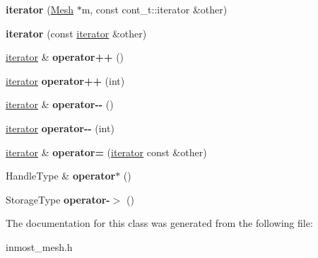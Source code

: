 \begin{DoxyCompactItemize}
\item 
\hypertarget{classINMOST_1_1ElementArray_1_1iterator_a0d7c6fedcf18f246d2525278480ab202}{{\bfseries iterator} (\hyperlink{classINMOST_1_1Mesh}{Mesh} $\ast$m, const cont\-\_\-t\-::iterator \&other)}\label{classINMOST_1_1ElementArray_1_1iterator_a0d7c6fedcf18f246d2525278480ab202}

\item 
\hypertarget{classINMOST_1_1ElementArray_1_1iterator_af045c453415f0bdb6f66ecc275d68ad9}{{\bfseries iterator} (const \hyperlink{classINMOST_1_1ElementArray_1_1iterator}{iterator} \&other)}\label{classINMOST_1_1ElementArray_1_1iterator_af045c453415f0bdb6f66ecc275d68ad9}

\item 
\hypertarget{classINMOST_1_1ElementArray_1_1iterator_af94b1a080932ed4586be1333f254fa4e}{\hyperlink{classINMOST_1_1ElementArray_1_1iterator}{iterator} \& {\bfseries operator++} ()}\label{classINMOST_1_1ElementArray_1_1iterator_af94b1a080932ed4586be1333f254fa4e}

\item 
\hypertarget{classINMOST_1_1ElementArray_1_1iterator_acba25b30b678dd9b4b77a007481af687}{\hyperlink{classINMOST_1_1ElementArray_1_1iterator}{iterator} {\bfseries operator++} (int)}\label{classINMOST_1_1ElementArray_1_1iterator_acba25b30b678dd9b4b77a007481af687}

\item 
\hypertarget{classINMOST_1_1ElementArray_1_1iterator_a03175615f0565c3844375ec17ff69d31}{\hyperlink{classINMOST_1_1ElementArray_1_1iterator}{iterator} \& {\bfseries operator-\/-\/} ()}\label{classINMOST_1_1ElementArray_1_1iterator_a03175615f0565c3844375ec17ff69d31}

\item 
\hypertarget{classINMOST_1_1ElementArray_1_1iterator_ad0701ce77f9a5928bf121777e3ca5016}{\hyperlink{classINMOST_1_1ElementArray_1_1iterator}{iterator} {\bfseries operator-\/-\/} (int)}\label{classINMOST_1_1ElementArray_1_1iterator_ad0701ce77f9a5928bf121777e3ca5016}

\item 
\hypertarget{classINMOST_1_1ElementArray_1_1iterator_ae63a652dc0fa497c82e212990ce3de9d}{\hyperlink{classINMOST_1_1ElementArray_1_1iterator}{iterator} \& {\bfseries operator=} (\hyperlink{classINMOST_1_1ElementArray_1_1iterator}{iterator} const \&other)}\label{classINMOST_1_1ElementArray_1_1iterator_ae63a652dc0fa497c82e212990ce3de9d}

\item 
\hypertarget{classINMOST_1_1ElementArray_1_1iterator_afadc7da73e24f64fa4a14dbfe4c44f83}{Handle\-Type \& {\bfseries operator$\ast$} ()}\label{classINMOST_1_1ElementArray_1_1iterator_afadc7da73e24f64fa4a14dbfe4c44f83}

\item 
\hypertarget{classINMOST_1_1ElementArray_1_1iterator_a3168cfa2e3de18178aa55128df623f49}{Storage\-Type {\bfseries operator-\/$>$} ()}\label{classINMOST_1_1ElementArray_1_1iterator_a3168cfa2e3de18178aa55128df623f49}

\end{DoxyCompactItemize}


The documentation for this class was generated from the following file\-:\begin{DoxyCompactItemize}
\item 
inmost\-\_\-mesh.\-h\end{DoxyCompactItemize}
